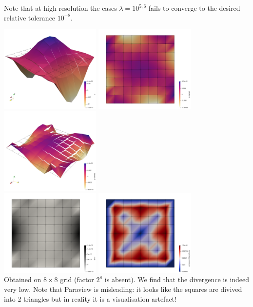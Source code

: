 Note that at high resolution the cases $\lambda=10^{5,6}$ fails to converge to the 
desired relative tolerance $10^{-8}$. 

\begin{center}
\includegraphics[width=5cm]{python_codes/fieldstone_161/results/bench2/press}
\includegraphics[width=5cm]{python_codes/fieldstone_161/results/bench2/press_error}
\includegraphics[width=5cm]{python_codes/fieldstone_161/results/bench2/press_error2}\\
\includegraphics[width=5cm]{python_codes/fieldstone_161/results/bench2/divv}
\includegraphics[width=5cm]{python_codes/fieldstone_161/results/bench2/vel_error}\\
{\captionfont Obtained on $8\times8$ grid (factor $2^8$ is absent). 
We find that the divergence is indeed very low.
Note that Paraview is misleading: it looks like the squares are divived into 2 triangles but
in reality it is a visualisation artefact!}
\end{center}

